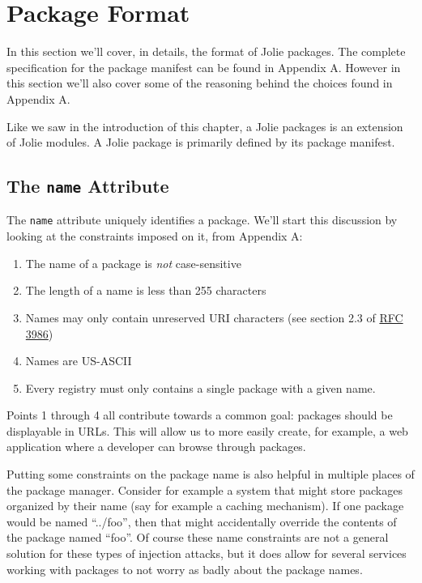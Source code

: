 \section{Package Format}

In this section we'll cover, in details, the format of Jolie packages. The
complete specification for the package manifest can be found in Appendix A.
However in this section we'll also cover some of the reasoning behind the
choices found in Appendix A.

Like we saw in the introduction of this chapter, a Jolie packages is an
extension of Jolie modules. A Jolie package is primarily defined by its package
manifest.

\subsection{The {\tt name} Attribute}

The \texttt{name} attribute uniquely identifies a package. We'll
start this discussion by looking at the constraints imposed on it, from
Appendix A:

\begin{enumerate}
\item
    The name of a package is \emph{not} case-sensitive
\item
    The length of a name is less than 255 characters
\item
    Names may only contain unreserved URI characters (see section 2.3 of
    \href{https://www.ietf.org/rfc/rfc3986.txt}{RFC 3986})
\item
    Names are US-ASCII
\item
    Every registry must only contains a single package with a given name.
\end{enumerate}

Points 1 through 4 all contribute towards a common goal: packages should be
displayable in URLs. This will allow us to more easily create, for example,
a web application where a developer can browse through packages.

Putting some constraints on the package name is also helpful in multiple places
of the package manager. Consider for example a system that might store packages
organized by their name (say for example a caching mechanism). If one package
would be named ``../foo'', then that might accidentally override the contents
of the package named ``foo''. Of course these name constraints are not a
general solution for these types of injection attacks, but it does allow for
several services working with packages to not worry as badly about the package
names.

